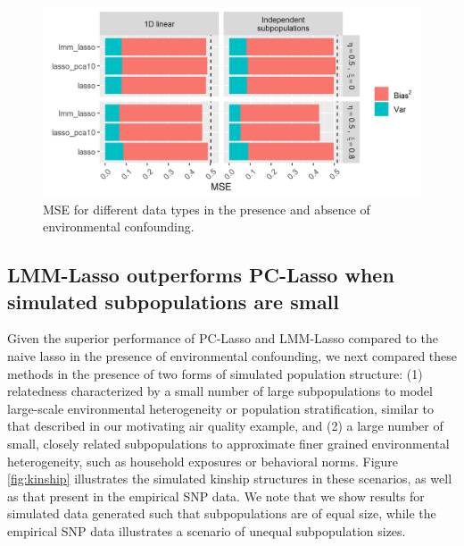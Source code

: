 
\begin{figure}[H]
    \centering
    \includegraphics[scale = 0.9]{figures/fig1b.png}
    \caption{MSE for different data types in the presence and absence of environmental confounding.}
    \label{fig:mse}
\end{figure}

\subsection{LMM-Lasso outperforms PC-Lasso when simulated subpopulations are small}
Given the superior performance of PC-Lasso and LMM-Lasso compared to the naive lasso in the presence of environmental confounding, we next compared these methods in the presence of two forms of simulated population structure: (1) relatedness characterized by a small number of large subpopulations to model large-scale environmental heterogeneity or population stratification, similar to that described in our motivating air quality example, and (2) a large number of small, closely related subpopulations to approximate finer grained environmental heterogeneity, such as household exposures or behavioral norms. Figure \ref{fig:kinship} illustrates the simulated kinship structures in these scenarios, as well as that present in the empirical SNP data. We note that we show results for simulated data generated such that subpopulations are of equal size, while the empirical SNP data illustrates a scenario of unequal subpopulation sizes.

